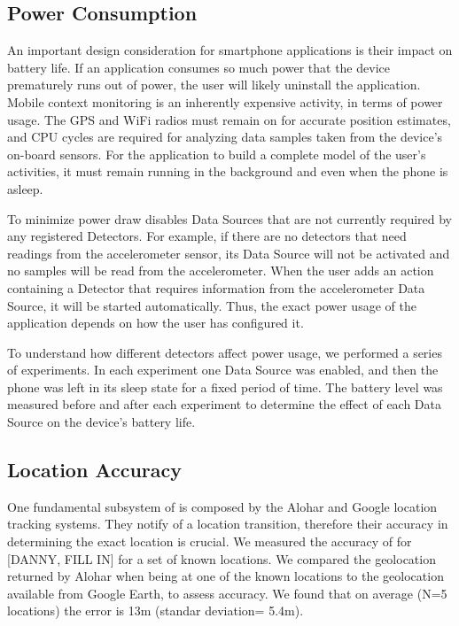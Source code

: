 \documentclass{acm_proc_article-sp}
\begin{document}
\subsection{Power Consumption}
An important design consideration for smartphone applications is their impact on battery life. If an application consumes so much power that the device prematurely runs out of power, the user will likely uninstall the application. Mobile context monitoring is an inherently expensive activity, in terms of power usage. The GPS and WiFi radios must remain on for accurate position estimates, and CPU cycles are required for analyzing data samples taken from the device's on-board sensors. For the application to build a complete model of the user's activities, it must remain running in the background and even when the phone is asleep. 

To minimize power draw \LS disables Data Sources that are not currently required by any registered Detectors. For example, if there are no detectors that need readings from the accelerometer sensor, its Data Source will not be activated and no samples will be read from the accelerometer. When the user adds an action containing a Detector that requires information from the accelerometer Data Source, it will be started automatically. Thus, the exact power usage of the application depends on how the user has configured it.

To understand how different detectors affect power usage, we performed a series of experiments. In each experiment one Data Source was enabled, and then the phone was left in its sleep state for a fixed period of time. The battery level was measured before and after each experiment to determine the effect of each Data Source on the device's battery life.

\subsection{Location Accuracy}
One fundamental subsystem of \LS is composed by the Alohar and Google location tracking systems. They notify \LS of a location transition, therefore their accuracy in determining the exact location is crucial. We measured the accuracy of \LS for [DANNY, FILL IN] for a set of known locations. We compared the geolocation returned by Alohar when being at one of the known locations to the geolocation available from Google Earth, to assess accuracy. 
We found that on average (N=5 locations) the error is 13m (standar deviation= 5.4m).
\end{document}

